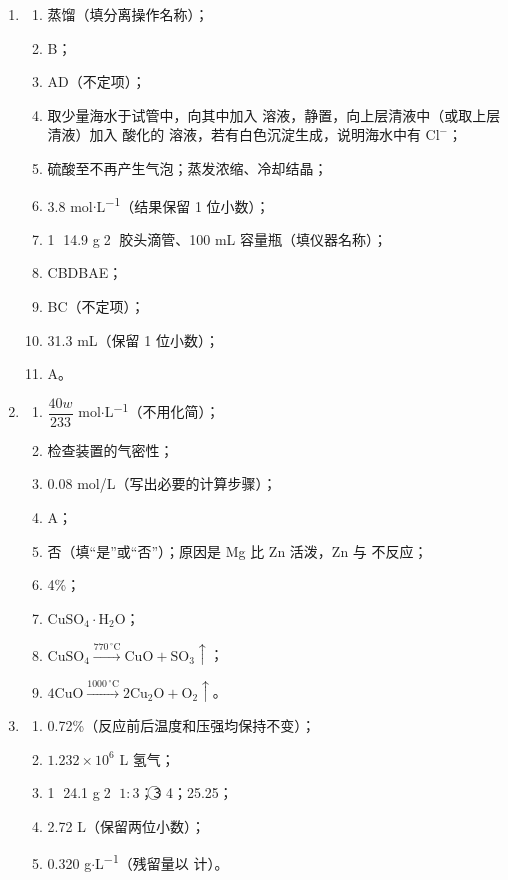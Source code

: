 \documentclass[11pt,a4paper]{article}
\begin{document}
\begin{enumerate}[label=\textbf{\arabic*.},leftmargin=2.5em]
\item
\begin{enumerate}[label=（\arabic*）]
\item 蒸馏（填分离操作名称）；
\item B；
\item AD（不定项）；
\item 取少量海水于试管中，向其中加入  溶液，静置，向上层清液中（或取上层清液）加入  酸化的  溶液，若有白色沉淀生成，说明海水中有 $\mathrm{Cl^-}$；
\item 硫酸至不再产生气泡；蒸发浓缩、冷却结晶；
\item 3.8 mol$\cdot$L\textsuperscript{$-$1}（结果保留 1 位小数）；
\item \textcircled{1} 14.9 g；\textcircled{2} 胶头滴管、100 mL 容量瓶（填仪器名称）；
\item CBDBAE；
\item BC（不定项）；
\item 31.3 mL（保留 1 位小数）；
\item A。
\end{enumerate}

\item
\begin{enumerate}[label=（\arabic*）]
\item $\dfrac{40w}{233}$ mol$\cdot$L\textsuperscript{$-$1}（不用化简）；
\item 检查装置的气密性；
\item $0.08$ mol/L（写出必要的计算步骤）；
\item A；
\item 否（填“是”或“否”）；原因是 Mg 比 Zn 活泼，Zn 与  不反应；
\item 4\%；
\item $\mathrm{CuSO_4\cdot H_2O}$；
\item $\mathrm{CuSO_4\xrightarrow{770\,^{\circ}\mathrm{C}}CuO+SO_3\uparrow}$；
\item $\mathrm{4CuO\xrightarrow{1000\,^{\circ}\mathrm{C}}2Cu_2O+O_2\uparrow}$。
\end{enumerate}

\item
\begin{enumerate}[label=（\arabic*）]
\item 0.72\%（反应前后温度和压强均保持不变）；
\item $1.232\times 10^{6}$ L 氢气；
\item \textcircled{1} 24.1 g；\textcircled{2} $1:3$；\textcircled{3} 4；25.25；
\item 2.72 L（保留两位小数）；
\item 0.320 g$\cdot$L\textsuperscript{$-$1}（残留量以  计）。
\end{enumerate}
\end{enumerate}
\fi
\end{document}
